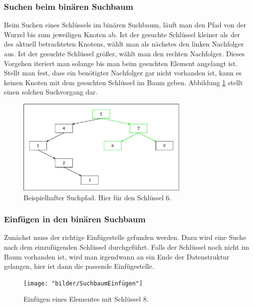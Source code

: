 \documentclass[11pt, a4paper]{article}
\begin{document}
	
	\subsubsection {Suchen beim binären Suchbaum}
	\label{sec:Suchen beim binären Suchbaum}
	Beim Suchen eines Schlüssels im binären Suchbaum, läuft man den Pfad von der Wurzel bis zum jeweiligen Knoten ab. Ist der gesuchte Schlüssel kleiner als der des aktuell betrachteten Knotens, wählt man als nächstes den linken Nachfolger aus. Ist der gesuchte Schlüssel größer, wählt man den rechten Nachfolger. Dieses Vorgehen iteriert man solange bis man beim gesuchten Element angelangt ist. Stellt man fest, dass ein benötigter Nachfolger gar nicht vorhanden ist, kann es keinen Knoten mit dem gesuchten Schlüssel im Baum geben.
	Abbildung \ref{fig:binSuchSuchpfad} stellt einen solchen Suchvorgang dar.
	
	\begin{figure}[h]
		\centering
		\includegraphics[width=0.75\textwidth]{"bilder/binSuchSuchpfad"}
		\caption{Beispielhafter Suchpfad. Hier für den Schlüssel 6.}
		\label{fig:binSuchSuchpfad}
	\end{figure}

	\subsubsection {Einfügen in den binären Suchbaum}
    Zunächst muss der richtige Einfügestelle gefunden werden. Dazu wird eine Suche nach dem einzufügenden Schlüssel 
    durchgeführt. Falls der Schlüssel noch nicht im Baum vorhanden ist, wird man irgendwann an ein Ende der Datenstruktur gelangen, hier ist dann die passende Einfügestelle. 
    
    \begin{figure}[h]
    	\centering
    	\texttt{[image: "bilder/SuchbaumEinfügen"]}
    	\caption{Einfügen eines Elementes mit Schlüssel 8.}
    	\label{fig:SuchbaumEinfügen}
    \end{figure}
     
\end{document}
